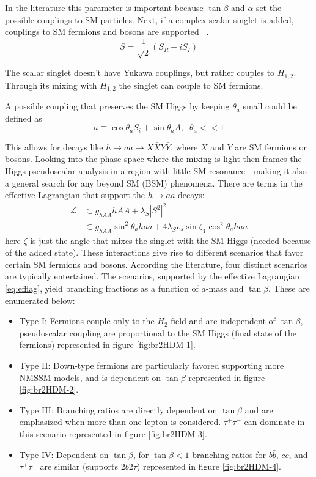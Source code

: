 In the literature this parameter is important because $\tan \beta$ and $\alpha$ set the possible couplings to SM particles. Next, if a complex scalar singlet is added, couplings to SM fermions and bosons are supported ~\cite{Curtin_2014}.
\begin{equation}S = \frac{1}{\sqrt{2}}(S_R + iS_I)\end{equation}

The scalar singlet doesn't have Yukawa couplings, but rather couples to $H_{1,2}$. Through its mixing with $H_{1,2}$ the singlet can couple to SM fermions. 

A possible coupling that preserves the SM Higgs by keeping $\theta_a$ small could be defined as  
\begin{equation}a \equiv \cos \theta_a S_i + \sin \theta_a A ,\;\; \theta_a << 1 \end{equation}

This allows for decays like $h\rightarrow aa \rightarrow X\bar{X}Y\bar{Y}$, where $X$ and $Y$ are SM fermions or bosons. Looking into the phase space where the mixing is light then frames the Higgs pseudoscalar analysis in a region with little SM resonance---making it also a general search for any beyond SM (BSM) phenomena.
There are terms in the effective Lagrangian that support the $h \rightarrow aa $ decays:
\begin{align}
\label{eq:efflag}
\mathcal{L} &\subset g_{hAA}hAA + \lambda_S|S^2|^2  \\
            &\subset g_{hAA}\sin^2\theta_a haa + 4\lambda_S v_s \sin{\zeta_1} \cos^2\theta_a haa \nonumber 
\end{align}
here $\zeta$ is just the angle that mixes the singlet with the SM Higgs (needed because of the added state). These interactions give rise to different scenarios that favor certain SM fermions and bosons. According the literature, four distinct scenarios are typically entertained.  The scenarios, supported by the effective Lagrangian \ref{eq:efflag}, yield branching fractions as a function of $a$-mass and $\tan\beta$.  These are enumerated below:
\begin{itemize}
\item Type I: Fermions couple only to the $H_2$ field and are independent of $\tan\beta$, pseudoscalar coupling are proportional to the SM Higgs (final state of the fermions) represented in figure \ref{fig:br2HDM-1}.
\item Type II: Down-type fermions are particularly favored supporting more NMSSM models, and is dependent on $\tan\beta$ represented in figure \ref{fig:br2HDM-2}. 
\item Type III: Branching ratios are directly dependent on $\tan\beta$ and are emphasized when more than one lepton is considered. $\tau^+ \tau^-$ can dominate in this scenario represented in figure \ref{fig:br2HDM-3}. 
\item Type IV: Dependent on $\tan\beta$, for $\tan \beta < 1 $ branching ratios for $b\bar{b}$, $c\bar{c}$, and $\tau^+ \tau^-$ are similar (supports $2b2\tau$) represented in figure \ref{fig:br2HDM-4}.
\end{itemize}


